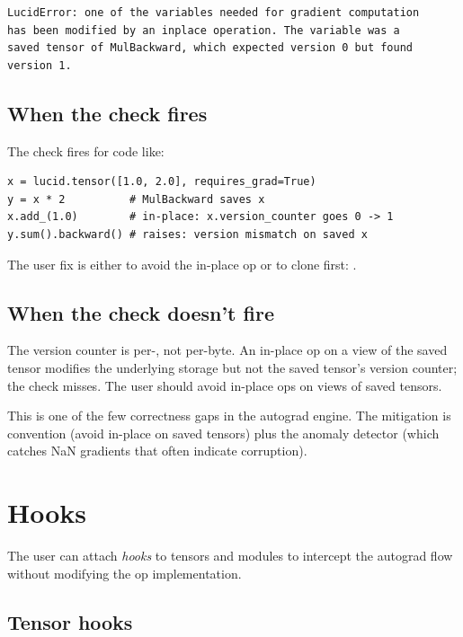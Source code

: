 \begin{verbatim}
LucidError: one of the variables needed for gradient computation
has been modified by an inplace operation. The variable was a
saved tensor of MulBackward, which expected version 0 but found
version 1.
\end{verbatim}

\subsection{When the check fires}
\label{ssec:autograd_engine:version_fires}

The check fires for code like:

\begin{lstlisting}[style=lucid,language=LucidPython]
x = lucid.tensor([1.0, 2.0], requires_grad=True)
y = x * 2          # MulBackward saves x
x.add_(1.0)        # in-place: x.version_counter goes 0 -> 1
y.sum().backward() # raises: version mismatch on saved x
\end{lstlisting}

The user fix is either to avoid the in-place op or to clone
first: .

\subsection{When the check doesn't fire}
\label{ssec:autograd_engine:version_misses}

The version counter is per-, not per-byte. An
in-place op on a view of the saved tensor modifies the underlying
storage but not the saved tensor's version counter; the check
misses. The user should avoid in-place ops on views of saved
tensors.

This is one of the few correctness gaps in the autograd engine.
The mitigation is convention (avoid in-place on saved tensors)
plus the anomaly detector (which catches NaN gradients that often
indicate corruption).

\section{Hooks}
\label{sec:autograd_engine:hooks}

The user can attach \emph{hooks} to tensors and modules to
intercept the autograd flow without modifying the op
implementation.

\subsection{Tensor hooks}
\label{ssec:autograd_engine:tensor_hooks}

